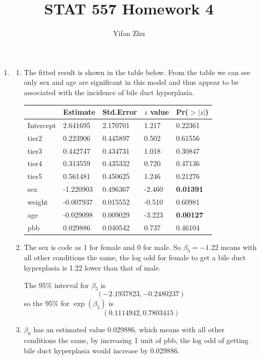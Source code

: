 \documentclass{article}
\begin{document}
	

	
	\title{STAT 557 Homework 4}
	\author{Yifan Zhu}
	\maketitle
	
	\begin{enumerate}[leftmargin = 0 em, label = \arabic*., font = \bfseries]
	\item 
	\begin{enumerate}
		\item
		The fitted result is shown in the table below. From the table we can see only sex and age are significant in this model and thus appear to be associated with the incidence of bile duct hyperplasia.

		\begin{center}
		\begin{tabular}{lllll}
		 \toprule
         		    &Estimate &Std.Error &$z$ value& Pr($>|z|$)\\
         		    \midrule   
         Intercept  & 2.641695&   2.170701&   1.217&  0.22361\\
         tier2      & 0.223906&   0.445897&   0.502&  0.61556\\
         tier3      & 0.442747&   0.434731&   1.018&  0.30847\\
         tier4      & 0.313559&   0.435332&   0.720&  0.47136\\
         tier5      & 0.561481&   0.450625&   1.246&  0.21276\\
         sex        &-1.220903&   0.496367&  -2.460&  \textbf{0.01391}\\
         weight     &-0.007937&   0.015552&  -0.510&  0.60981\\
         age        &-0.029098&   0.009029&  -3.223&  \textbf{0.00127}\\
         pbb        & 0.029886&   0.040542&   0.737&  0.46104\\ 
         \bottomrule
		\end{tabular}
		\end{center}

		\item 
		The sex is code as 1 for female and 0 for male. So $\beta_5 = -1.22$ means with all other conditions the same, the log odd for female to get a bile duct hyperplasia is 1.22 lower than that of male.

		The 95\% interval for $\beta_5$ is
		\[(-2.1937823, -0.2480237)\]
		so the 95\% for $\exp(\beta_5)$ is
		\[(0.1114942, 0.7803415)\]
		\item
		$\beta_8$ has an estimated value 0.029886, which means with all other conditions the same, by increasing 1 unit of pbb, the log odd of getting bile duct hyperplasia would increase by 0.029886. 


\end{enumerate}
\end{enumerate}
\end{document}
